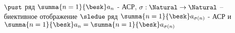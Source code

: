 \begin{lemma}

	$\pust$ ряд $\summa{n=1}{\besk}a_n$ - АСР, $\sigma: \Natural \to \Natural$ -- биективное отображение $\sledue$ ряд $\summa{n=1}{\besk}a_{\sigma(n)}$ - АСР и $\summa{n=1}{\besk}a_n = \summa{n=1}{\besk}a_{\sigma(n)}$
\end{lemma}
\newpage
